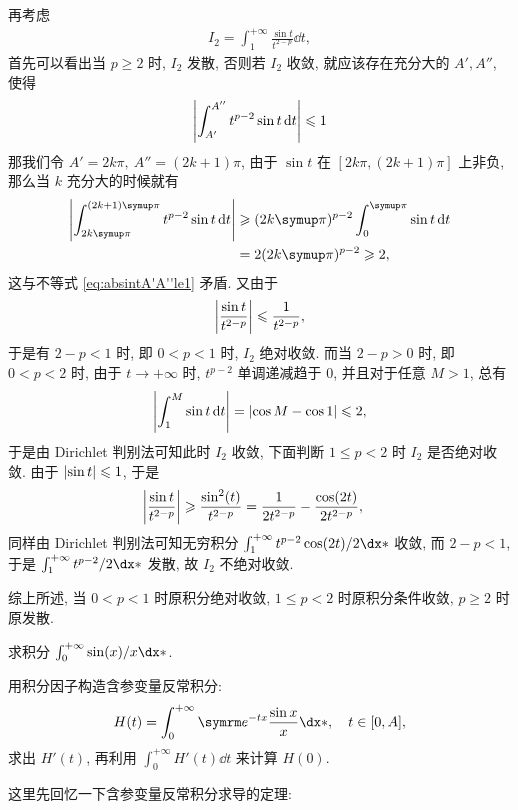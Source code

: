 \begin{exercise}[series=exer]
\begin{answer}
    再考虑
    \begin{align*}
        I_{2} = \int_{1}^{+\infty} \frac{\sin t}{t^{2 - p}} \dd{t},
    \end{align*} 
    首先可以看出当 $ p \ge 2 $ 时, $ I_{2} $ 发散, 否则若 $ I_{2} $ 收敛, 就应该存在充分大的 $ A', A'' $, 使得
    \begin{align}\label{eq:absintA'A''le1}
        \abs{\int_{A'}^{A''} t^{p - 2} \sin t \dd{t}} \leqslant 1
    \end{align}
    那我们令 $ A' = 2k \pi,\ A'' = (2k + 1) \pi $, 由于 $ \sin t $ 在 $ [2k\pi, (2k + 1)\pi] $ 上非负, 
    那么当 $ k $ 充分大的时候就有
    \begin{align*}
        \abs{\int_{2k\pi}^{(2k + 1)\pi} t^{p - 2} \sin t \dd{t}} & \ge (2k\pi)^{p - 2} \int_{0}^{\pi} \sin t \dd{t}  \\
        & = 2(2k \pi)^{p - 2} \ge 2,
    \end{align*} 
    这与不等式 \eqref{eq:absintA'A''le1} 矛盾. 又由于
    \begin{align*}
      \abs{\frac{\sin t}{t^{2 - p}}} \leqslant \frac{1}{t^{2 - p}},
    \end{align*}
    于是有 $ 2 - p < 1 $ 时, 即 $ 0 < p < 1 $ 时, $ I_{2} $ 绝对收敛. 而当 $ 2 - p > 0 $ 时, 即 $ 0 < p < 2 $ 时, 由于 $ t \to +\infty $ 时, $ t^{p - 2} $ 单调递减趋于 $ 0 $, 并且对于任意 $ M > 1 $, 总有
    \begin{align*}
      \abs{\int_{1}^{M} \sin t \dd{t}} = \abs{\cos M - \cos 1} \leqslant 2,
    \end{align*}
    于是由 Dirichlet 判别法可知此时 $ I_{2} $ 收敛, 下面判断 $ 1 \le p < 2 $ 时 $ I_{2} $ 是否绝对收敛. 
    由于 $ \abs{\sin t} \leqslant 1 $, 于是
    \begin{align*}
      \abs{\frac{\sin t}{t^{2 - p}}} & \geqslant \frac{\sin^{2}(t)}{t^{2 - p}} = \frac{1}{2t^{2 - p}} - \frac{\cos(2t)}{2t^{2 - p}},
    \end{align*}
    同样由 Dirichlet 判别法可知无穷积分 $ \int_{1}^{+\infty} t^{p - 2} \cos (2t)/2 \dx* $ 收敛, 而 $ 2 - p < 1 $, 于是 $ \int_{1}^{+\infty} t^{p - 2}/2 \dx* $ 发散, 故 $ I_{2} $ 不绝对收敛. 

    综上所述, 当 $ 0 < p < 1 $ 时原积分绝对收敛, $ 1 \le p < 2 $ 时原积分条件收敛, $ p \ge 2 $ 时原发散.
  \end{answer}
  \item 求积分 $ \int_{0}^{+\infty} \sin(x)/x \dx* $.
  \begin{hint}
    用积分因子构造含参变量反常积分:
    \begin{align*}
      H(t) = \int_{0}^{+\infty} \me^{-tx}\frac{\sin x}{x} \dx*, \quad t\in [0, A],
    \end{align*}
    求出 $ H'(t) $, 再利用 $ \int_{0}^{+\infty}H'(t)\dd{t} $ 来计算 $ H(0) $.
  \end{hint}
  \begin{answer}
    这里先回忆一下含参变量反常积分求导的定理:


\end{answer}
\end{exercise}

